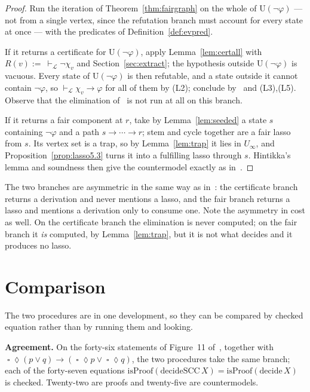 \documentclass[11pt,a4paper]{article}
\theoremstyle{definition}
\newcommand{\Always}{\mathop{\square}}
\newcommand{\Event}{\mathop{\lozenge}}
\newcommand{\Ust}{\mathrm{U}}
\newcommand{\proves}{\vdash_{\mathcal{L}}}
\begin{document}
\begin{proof}
Run the iteration of Theorem~\ref{thm:fairgraph} on the whole of
$\Ust(\neg\varphi)$ --- not from a single vertex, since the refutation branch
must account for every state at once --- with the predicates of
Definition~\ref{def:evpred}.

If it returns a certificate for $\Ust(\neg\varphi)$, apply
Lemma~\ref{lem:certall} with $R(v):=\ \proves\neg\chi_v$ and
Section~\ref{sec:extract}; the hypothesis outside $\Ust(\neg\varphi)$ is
vacuous.  Every state of $\Ust(\neg\varphi)$ is then refutable, and a state
outside it cannot contain $\neg\varphi$, so $\proves\chi_v\to\varphi$ for all
of them by (L2); conclude by~\cite[Lem.~2.6]{m4} and (L3),(L5).  Observe that
the elimination of~\cite{m4} is not run at all on this branch.

If it returns a fair component at $r$, take by Lemma~\ref{lem:seeded} a state
$s$ containing $\neg\varphi$ and a path $s\to\cdots\to r$; stem and cycle
together are a fair lasso from $s$.  Its vertex set is a trap, so by
Lemma~\ref{lem:trap} it lies in $U_\infty$, and
Proposition~\ref{prop:lasso5.3} turns it into a fulfilling lasso through $s$.
Hintikka's lemma and soundness then give the countermodel exactly as
in~\cite[Thm.~6.1]{m4}.
\end{proof}

The two branches are asymmetric in the same way as in~\cite{m4}: the
certificate branch returns a derivation and never mentions a lasso, and the
fair branch returns a lasso and mentions a derivation only to consume one.
Note the asymmetry in cost as well.  On the certificate branch the elimination
is never computed; on the fair branch it \emph{is} computed, by
Lemma~\ref{lem:trap}, but it is not what decides and it produces no lasso.

\section{Comparison}\label{sec:compare}

The two procedures are in one development, so they can be compared by checked
equation rather than by running them and looking.

\medskip\noindent\textbf{Agreement.}  On the forty-six statements of Figure~11
of~\cite{sgl}, together with
$\Always\Event(p\vee q)\to(\Always\Event p\vee\Always\Event q)$, the two
procedures take the same branch; each of the forty-seven equations
$\mathrm{isProof}(\mathrm{decideSCC}\,X)=\mathrm{isProof}(\mathrm{decide}\,X)$
is checked.  Twenty-two are proofs and twenty-five are countermodels.
\end{document}
